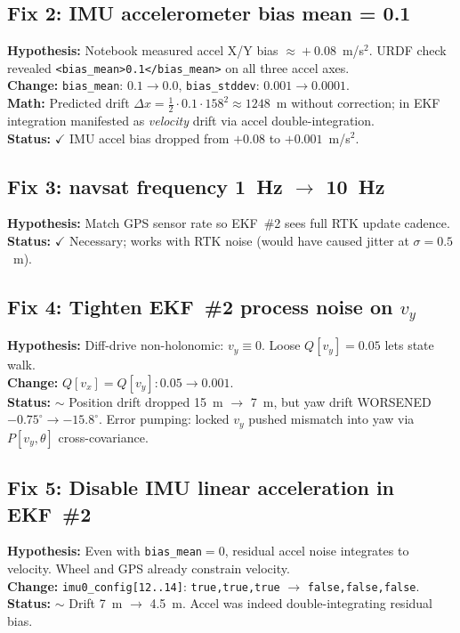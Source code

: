 \documentclass[11pt,a4paper]{article}
\newcommand{\good}[1]{\textcolor{good}{\textbf{#1}}}
\newcommand{\partialw}[1]{\textcolor{partial}{\textbf{#1}}}
\begin{document}
\subsection{Fix 2: IMU accelerometer bias mean = 0.1}
\textbf{Hypothesis:} Notebook measured accel X/Y bias $\approx\!+0.08$~m/s$^2$.
URDF check revealed \texttt{<bias\_mean>0.1</bias\_mean>} on all three accel axes.\\
\textbf{Change:} \texttt{bias\_mean}: $0.1 \to 0.0$, \texttt{bias\_stddev}: $0.001 \to 0.0001$.\\
\textbf{Math:} Predicted drift $\Delta x = \tfrac{1}{2} \cdot 0.1 \cdot 158^2 \approx 1248$~m
without correction; in EKF integration manifested as \emph{velocity} drift via accel double-integration.\\
\textbf{Status:} \good{$\checkmark$} IMU accel bias dropped from $+0.08$ to $+0.001$~m/s$^2$.

\subsection{Fix 3: navsat frequency 1~Hz $\to$ 10~Hz}
\textbf{Hypothesis:} Match GPS sensor rate so EKF~\#2 sees full RTK update cadence.\\
\textbf{Status:} \good{$\checkmark$} Necessary; works with RTK noise (would have caused jitter at $\sigma\!=\!0.5$~m).

\subsection{Fix 4: Tighten EKF~\#2 process noise on $v_y$}
\textbf{Hypothesis:} Diff-drive non-holonomic: $v_y \equiv 0$. Loose $Q[v_y]\!=\!0.05$ lets state walk.\\
\textbf{Change:} $Q[v_x] = Q[v_y]: 0.05 \to 0.001$.\\
\textbf{Status:} \partialw{$\sim$} Position drift dropped 15~m $\to$ 7~m, but yaw drift WORSENED $-0.75^\circ \to -15.8^\circ$.
Error pumping: locked $v_y$ pushed mismatch into yaw via $P[v_y, \theta]$ cross-covariance.

\subsection{Fix 5: Disable IMU linear acceleration in EKF~\#2}
\textbf{Hypothesis:} Even with \texttt{bias\_mean}$=0$, residual accel noise integrates to velocity.
Wheel and GPS already constrain velocity.\\
\textbf{Change:} \texttt{imu0\_config[12..14]}: \texttt{true,true,true} $\to$ \texttt{false,false,false}.\\
\textbf{Status:} \partialw{$\sim$} Drift 7~m $\to$ 4.5~m. Accel was indeed double-integrating residual bias.
\end{document}
